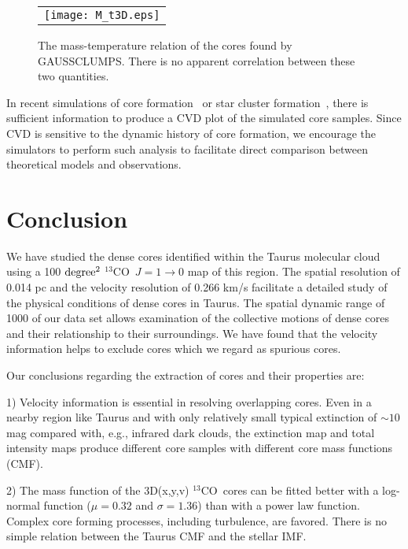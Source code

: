 \documentclass[12pt,preprint]{aastex}
\def\13co{$^{13}$CO}
\begin{document}
\begin{figure}[htb]
\centering
\begin{tabular}{c}
\texttt{[image: M\_t3D.eps]}\\
\end{tabular}
\caption{The mass-temperature relation of the cores found by GAUSSCLUMPS. There is no apparent correlation between these two quantities.
\label{mass_temperature}}
\end{figure}


In recent simulations of core formation~\citep[e.g.\ ][]{Gong2011} or star cluster formation~\citep[e.g.][]{Offner2009}, there is sufficient information to produce a CVD plot of the simulated core samples. Since CVD is sensitive to the dynamic history
of core formation,  we encourage the simulators to perform such analysis to facilitate direct comparison between theoretical models and observations.



\section{Conclusion}
\label{sec:conclusion}

We have studied the dense cores identified within the Taurus molecular cloud using a 100 $\rm degree^2$ \13co\ $J=1\to 0$ map of this region. The spatial resolution of 0.014 pc  and the velocity resolution of 0.266 km/s facilitate a detailed study of the physical conditions of dense cores in Taurus. The spatial dynamic range of 1000 of our data set allows  examination of the collective motions of dense cores and their relationship to their surroundings. We have found that the velocity information helps to exclude cores which we regard as spurious cores.

Our conclusions regarding the extraction of cores and their properties are:

1) Velocity information is essential in resolving  overlapping cores. Even in a nearby region like Taurus and with only relatively small typical extinction of $\sim 10$ mag compared with, e.g., infrared dark clouds, the extinction map and total intensity maps produce different core samples with different core mass functions (CMF).

2) The mass function of the 3D(x,y,v) \13co\ cores can be fitted better with a log-normal function ($\mu = 0.32$ and $\sigma= 1.36$) than with a
power law function. Complex core forming processes, including turbulence, are favored. There is no simple relation between the Taurus CMF and
the stellar IMF.
\end{document}
